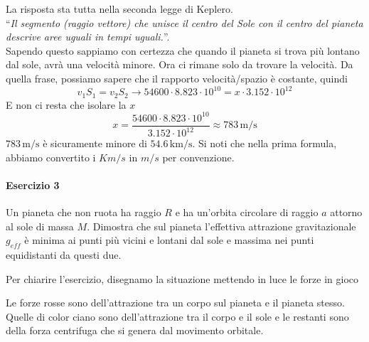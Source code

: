 La risposta sta tutta nella seconda legge di Keplero.\\
``\textit{Il segmento (raggio vettore) che unisce il centro del Sole con il centro del 
pianeta descrive aree uguali in tempi uguali.}''.\\
Sapendo questo sappiamo con certezza che quando il pianeta si trova più lontano dal sole, avrà una
velocità minore. Ora ci rimane solo da trovare la velocità. Da quella frase, possiamo sapere che il
rapporto velocità/spazio è costante, quindi
\begin{equation*}
  v_1S_1 = v_2S_2 \rightarrow 54600\cdot8.823\cdot10^{10} = x\cdot3.152\cdot10^{12}
\end{equation*}
E non ci resta che isolare la $x$
\begin{equation*}
  x = \frac{54600\cdot8.823\cdot10^{10}}{3.152\cdot10^{12}} \approx \boxed{783\,\text{m/s}}
\end{equation*}
$783\,\text{m/s}$ è sicuramente minore di $54.6\,\text{km/s}$. Si noti che nella prima formula, 
abbiamo convertito i $Km/s$ in $m/s$ per convenzione.

\paragraph{Esercizio 3}
Un pianeta che non ruota ha raggio $R$ e ha un'orbita circolare di raggio $a$ attorno al sole di 
massa $M$. Dimostra che sul pianeta l'effettiva attrazione gravitazionale $g_{eff}$ è minima ai punti 
più vicini e lontani dal sole e massima nei punti equidistanti da questi due.
\divisor

Per chiarire l'esercizio, disegnamo la situazione mettendo in luce le forze in gioco
\begin{center}
\end{center}
Le forze rosse sono dell'attrazione tra un corpo sul pianeta e il pianeta stesso. Quelle di color 
ciano sono dell'attrazione tra il corpo e il sole e le restanti sono della forza centrifuga che si
genera dal movimento orbitale.\\ [\baselineskip]

